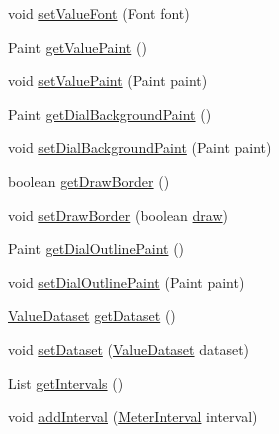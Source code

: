 \begin{DoxyCompactItemize}
void \mbox{\hyperlink{classorg_1_1jfree_1_1chart_1_1plot_1_1_meter_plot_a12feccbac31a09ab9512c424f38bdef4}{set\+Value\+Font}} (Font font)
\item 
Paint \mbox{\hyperlink{classorg_1_1jfree_1_1chart_1_1plot_1_1_meter_plot_aedb95f7f25ba6d7083dfeb8c1786d626}{get\+Value\+Paint}} ()
\item 
void \mbox{\hyperlink{classorg_1_1jfree_1_1chart_1_1plot_1_1_meter_plot_a35b5c4f95211a811e7efc9e2015d0886}{set\+Value\+Paint}} (Paint paint)
\item 
Paint \mbox{\hyperlink{classorg_1_1jfree_1_1chart_1_1plot_1_1_meter_plot_aa28a88c359b9a441fdcc8d4f1f0a5ecf}{get\+Dial\+Background\+Paint}} ()
\item 
void \mbox{\hyperlink{classorg_1_1jfree_1_1chart_1_1plot_1_1_meter_plot_aecab997e41adbba2f37c6da45a1745f0}{set\+Dial\+Background\+Paint}} (Paint paint)
\item 
boolean \mbox{\hyperlink{classorg_1_1jfree_1_1chart_1_1plot_1_1_meter_plot_a0f107cfb9d7a9829dd8214c324bc2ea5}{get\+Draw\+Border}} ()
\item 
void \mbox{\hyperlink{classorg_1_1jfree_1_1chart_1_1plot_1_1_meter_plot_a4926421a84350958e8e7cf40f25f2e4a}{set\+Draw\+Border}} (boolean \mbox{\hyperlink{classorg_1_1jfree_1_1chart_1_1plot_1_1_meter_plot_ab5c4f46ac19c288a102da153e691d2f0}{draw}})
\item 
Paint \mbox{\hyperlink{classorg_1_1jfree_1_1chart_1_1plot_1_1_meter_plot_a5b42cb9e31e25b2acd71c44dbc420388}{get\+Dial\+Outline\+Paint}} ()
\item 
void \mbox{\hyperlink{classorg_1_1jfree_1_1chart_1_1plot_1_1_meter_plot_a3f0b3c240308ac9df18c9cdd5ddd9764}{set\+Dial\+Outline\+Paint}} (Paint paint)
\item 
\mbox{\hyperlink{interfaceorg_1_1jfree_1_1data_1_1general_1_1_value_dataset}{Value\+Dataset}} \mbox{\hyperlink{classorg_1_1jfree_1_1chart_1_1plot_1_1_meter_plot_a01224156fe73c19bd13b3b4feb58e884}{get\+Dataset}} ()
\item 
void \mbox{\hyperlink{classorg_1_1jfree_1_1chart_1_1plot_1_1_meter_plot_aba3154ee89861d9e3ca9b0fd7239b829}{set\+Dataset}} (\mbox{\hyperlink{interfaceorg_1_1jfree_1_1data_1_1general_1_1_value_dataset}{Value\+Dataset}} dataset)
\item 
List \mbox{\hyperlink{classorg_1_1jfree_1_1chart_1_1plot_1_1_meter_plot_a1b0919aaa6783b57c61ab7c8868b87d9}{get\+Intervals}} ()
\item 
void \mbox{\hyperlink{classorg_1_1jfree_1_1chart_1_1plot_1_1_meter_plot_ab60286f0f485696e89b642d0bcad3c83}{add\+Interval}} (\mbox{\hyperlink{classorg_1_1jfree_1_1chart_1_1plot_1_1_meter_interval}{Meter\+Interval}} interval)

\end{DoxyCompactItemize}
